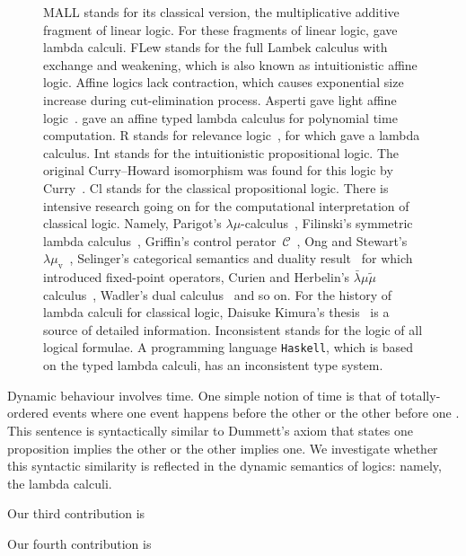 \begin{figure}
{  \textsf{MALL} stands for its classical version, the multiplicative
  additive fragment of linear logic.  For these fragments of linear
  logic,
  \citet{abramsky1993computational} gave lambda calculi.
  \textsf{FLew} stands for the full Lambek calculus with exchange and
  weakening,
  which is also known as intuitionistic affine logic.
  Affine logics lack contraction, which causes exponential size increase
  during cut-elimination process.
  Asperti gave light affine logic~\citep{asperti2002}.
  \citet{terui2007} gave an affine typed lambda calculus for polynomial
  time computation.
  \textsf{R} stands for relevance logic~\citep{urquhart1972},
  for which \citet{gabbay1992} gave a lambda calculus.
  \textsf{Int} stands for the intuitionistic propositional logic.
  The original Curry--Howard isomorphism was found for this logic by
  Curry~\citep{curry1942}.
  \textsf{Cl} stands for the classical propositional logic.
  There is intensive research going on for the computational
  interpretation of classical logic.  Namely,
  Parigot's $\lambda\mu$-calculus~\citep{lambdamu},
  Filinski's symmetric lambda calculus~\citep{filinski1989},
  Griffin's control perator~$\mathcal C$~\citep{griffin1990},
  Ong and Stewart's $\lambda\mu_{\mathrm
  v}$~\citep{ong-stewart},
  Selinger's categorical semantics and duality
  result~\citep{selinger2001} for which \citet{kakutani2002} introduced
  fixed-point
  operators,
  Curien and Herbelin's $\bar\lambda\mu\tilde\mu$
  calculus~\citep{curien2000},
  Wadler's dual calculus~\citep{wadler-dual, wadler-reloaded} and so on.
  For the history of lambda calculi for classical logic,
  Daisuke Kimura's thesis~\cite{kimura} is a source of detailed
  information.
  \textsf{Inconsistent} stands for the logic of all logical formulae.
  A programming language \texttt{Haskell}, which is based on
  the typed lambda calculi, has
  an inconsistent type system.
  }
  \label{fig:lattice}
 \end{figure}
Dynamic behaviour involves time.
One simple notion of time is that of totally-ordered events where
one event happens before the other or the other before one .
This sentence is syntactically similar to Dummett's axiom that states
one proposition implies the other or the other implies one.
We investigate whether this syntactic similarity is reflected
in the dynamic semantics of logics: namely, the lambda calculi.

Our third contribution is

Our fourth contribution is


